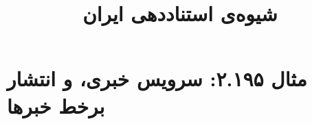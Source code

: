 \documentclass[a4paper,10pt]{article}
\begin{document}
\title{شیوه‌ی استناددهی ایران
 }
\author{}
\date{}
\maketitle



\section*{مثال ۲.۱۹۵: سرویس خبری، و انتشار برخط خبرها}

\cite{آرمین1385}\\
\cite{سبزعلیان1385}\\
\cite{mitchel2001}\\
\cite{reuters2001}\\






\end{document}
